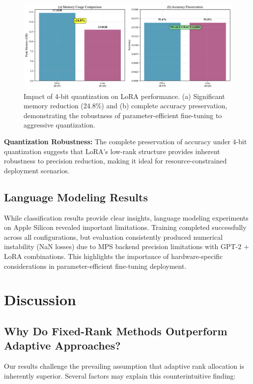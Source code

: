 \documentclass[11pt,a4paper]{article}
\begin{document}
\begin{figure}[htbp]
    \centering
    \includegraphics[width=\textwidth]{figures/figure3_quantization_impact.pdf}
    \caption{Impact of 4-bit quantization on LoRA performance. (a) Significant memory reduction (24.8\%) and (b) complete accuracy preservation, demonstrating the robustness of parameter-efficient fine-tuning to aggressive quantization.}
    \label{fig:quantization_impact}
\end{figure}

\textbf{Quantization Robustness:} The complete preservation of accuracy under 4-bit quantization suggests that LoRA's low-rank structure provides inherent robustness to precision reduction, making it ideal for resource-constrained deployment scenarios.

\subsection{Language Modeling Results}

While classification results provide clear insights, language modeling experiments on Apple Silicon revealed important limitations. Training completed successfully across all configurations, but evaluation consistently produced numerical instability (NaN losses) due to MPS backend precision limitations with GPT-2 + LoRA combinations. This highlights the importance of hardware-specific considerations in parameter-efficient fine-tuning deployment.

\section{Discussion}

\subsection{Why Do Fixed-Rank Methods Outperform Adaptive Approaches?}

Our results challenge the prevailing assumption that adaptive rank allocation is inherently superior. Several factors may explain this counterintuitive finding:
\end{document}
